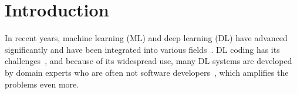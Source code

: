 \section{Introduction}
In recent years, machine learning (ML) and deep learning (DL) have advanced significantly and
have been integrated into various fields~\cite{hordri2016deep, kamilaris2018deep, gamboa2017deep}. DL coding has its challenges~\cite{arpteg2018software}, and because of its widespread use, many DL systems are developed by domain experts who are often not software developers~\cite{park2021facilitating, singaravel2020explaining}, which amplifies the problems even more.




